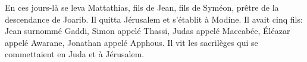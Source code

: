 En ces jours-là se leva Mattathias, fils de Jean, fils de Syméon,
	prêtre de la descendance de Joarib.
	Il quitta Jérusalem et s’établit à Modine.
Il avait cinq fils: Jean surnommé Gaddi, Simon appelé Thassi,
	Judas appelé Maccabée, Éléazar appelé Awarane, Jonathan appelé Apphous.
Il vit les sacrilèges qui se commettaient en Juda et à Jérusalem.
